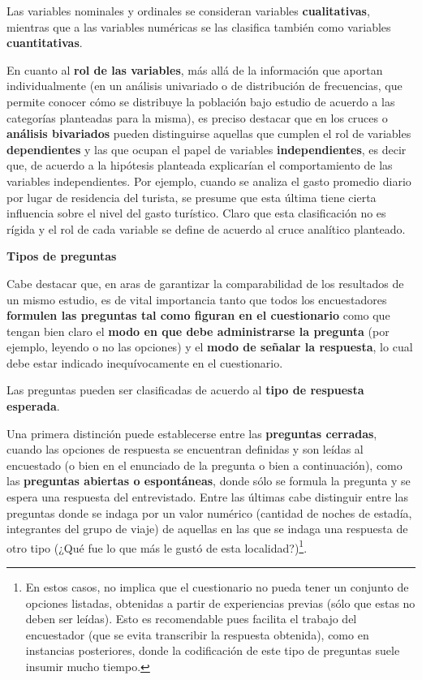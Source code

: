 \documentclass[
]{book}
\begin{document}
Las variables nominales y ordinales se consideran variables \textbf{cualitativas}, mientras que a las variables numéricas se las clasifica también como variables \textbf{cuantitativas}.

En cuanto al \textbf{rol de las variables}, más allá de la información que aportan individualmente (en un análisis univariado o de distribución de frecuencias, que permite conocer cómo se distribuye la población bajo estudio de acuerdo a las categorías planteadas para la misma), es preciso destacar que en los cruces o \textbf{análisis bivariados} pueden distinguirse aquellas que cumplen el rol de variables \textbf{dependientes} y las que ocupan el papel de variables \textbf{independientes}, es decir que, de acuerdo a la hipótesis planteada explicarían el comportamiento de las variables independientes. Por ejemplo, cuando se analiza el gasto promedio diario por lugar de residencia del turista, se presume que esta última tiene cierta influencia sobre el nivel del gasto turístico. Claro que esta clasificación no es rígida y el rol de cada variable se define de acuerdo al cruce analítico planteado.

\textbf{Tipos de preguntas}

Cabe destacar que, en aras de garantizar la comparabilidad de los resultados de un mismo estudio, es de vital importancia tanto que todos los encuestadores \textbf{formulen las preguntas tal como figuran en el cuestionario} como que tengan bien claro el \textbf{modo en que debe administrarse la pregunta} (por ejemplo, leyendo o no las opciones) y el \textbf{modo de señalar la respuesta}, lo cual debe estar indicado inequívocamente en el cuestionario.

Las preguntas pueden ser clasificadas de acuerdo al \textbf{tipo de respuesta esperada}.

Una primera distinción puede establecerse entre las \textbf{preguntas cerradas}, cuando las opciones de respuesta se encuentran definidas y son leídas al encuestado (o bien en el enunciado de la pregunta o bien a continuación), como las \textbf{preguntas abiertas o espontáneas}, donde sólo se formula la pregunta y se espera una respuesta del entrevistado. Entre las últimas cabe distinguir entre las preguntas donde se indaga por un valor numérico (cantidad de noches de estadía, integrantes del grupo de viaje) de aquellas en las que se indaga una respuesta de otro tipo (¿Qué fue lo que más le gustó de esta localidad?)\footnote{En estos casos, no implica que el cuestionario no pueda tener un conjunto de opciones listadas, obtenidas a partir de experiencias previas (sólo que estas no deben ser leídas). Esto es recomendable pues facilita el trabajo del encuestador (que se evita transcribir la respuesta obtenida), como en instancias posteriores, donde la codificación de este tipo de preguntas suele insumir mucho tiempo.}.
\end{document}
